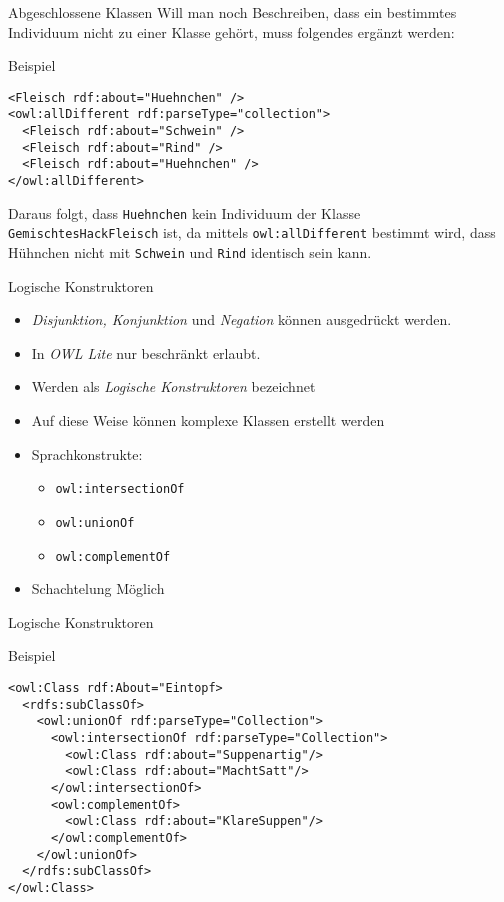 \documentclass{beamer}
\begin{document}
\begin{frame}[fragile]{Abgeschlossene Klassen}
Will man noch Beschreiben, dass ein bestimmtes Individuum nicht zu einer Klasse
gehört, muss folgendes ergänzt werden:	
\begin{block}{Beispiel}
\begin{lstlisting}[lang="xml"]
<Fleisch rdf:about="Huehnchen" />
<owl:allDifferent rdf:parseType="collection">
  <Fleisch rdf:about="Schwein" />
  <Fleisch rdf:about="Rind" />
  <Fleisch rdf:about="Huehnchen" />
</owl:allDifferent>
\end{lstlisting}
\end{block}
Daraus folgt, dass \texttt{Huehnchen} \alert{kein} Individuum der Klasse 
\texttt{GemischtesHackFleisch} ist,
da mittels \texttt{owl:allDifferent} bestimmt wird, dass Hühnchen \alert{nicht} mit \texttt {Schwein}
und \texttt{Rind} identisch sein kann.
\end{frame}
%
\begin{frame}[fragile]{Logische Konstruktoren}
\begin{itemize}
\item \emph{Disjunktion, Konjunktion} und \emph{Negation} können
ausgedrückt werden.
\item In \emph{OWL Lite} nur beschränkt erlaubt.
\item Werden als \emph{Logische Konstruktoren} bezeichnet
\item Auf diese Weise können komplexe Klassen erstellt werden
\item Sprachkonstrukte:
\begin{itemize}
\item \texttt{owl:intersectionOf}
\item \texttt{owl:unionOf}
\item \texttt{owl:complementOf}
\end{itemize}
\item Schachtelung Möglich
\end{itemize}
\end{frame}
%
\begin{frame}[fragile]{Logische Konstruktoren}
\begin{exampleblock}{Beispiel}
\begin{lstlisting}[lang="xml"]
<owl:Class rdf:About="Eintopf>
  <rdfs:subClassOf>
    <owl:unionOf rdf:parseType="Collection">
      <owl:intersectionOf rdf:parseType="Collection">
        <owl:Class rdf:about="Suppenartig"/>
        <owl:Class rdf:about="MachtSatt"/>
      </owl:intersectionOf>
      <owl:complementOf>
        <owl:Class rdf:about="KlareSuppen"/>
      </owl:complementOf>
    </owl:unionOf>
  </rdfs:subClassOf>
</owl:Class>
\end{lstlisting}
\end{exampleblock}

\end{frame}
%
\end{document}
